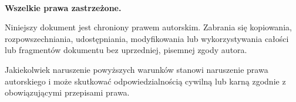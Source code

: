 \newpage
\begin{center}
  \vspace*{0.5cm}
  \textcopyright  ~\MyCopyrightYear ~\CopyrightAuthors
  \\\textbf{Wszelkie prawa zastrzeżone.}

  \vspace{0.5cm}
  Niniejszy dokument jest chroniony prawem autorskim.
  Zabrania się kopiowania, rozpowszechniania, udostępniania,
  modyfikowania lub wykorzystywania całości lub fragmentów
  dokumentu bez uprzedniej, pisemnej zgody autora.

  \vspace{0.5cm}
  Jakiekolwiek naruszenie powyższych warunków stanowi naruszenie
  prawa autorskiego i może skutkować odpowiedzialnością cywilną
  lub karną zgodnie z obowiązującymi przepisami prawa.
\end{center}
